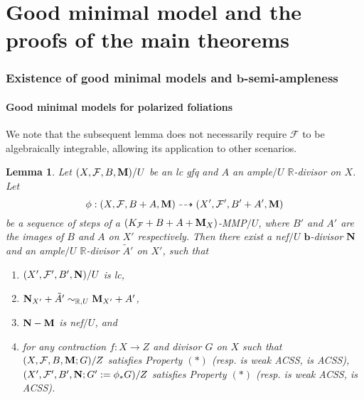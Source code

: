 \documentclass[11pt]{amsart}
\numberwithin{equation}{section}
\newcommand{\bb}{\bm{b}}
\newcommand{\Mm}{{\bf{M}}}
\newcommand{\Nn}{{\bf{N}}}
\newcommand{\Rr}{\mathbb{R}}
\newcommand{\Ff}{\mathcal{F}}
\newtheorem{lem}[thm]{Lemma}
\theoremstyle{definition}
\theoremstyle{definition}
\theoremstyle{definition}
\begin{document}
\part{Good minimal model and the proofs of the main theorems}\label{part:gmm}

\section{Existence of good minimal models and \texorpdfstring{$\bb$}{}-semi-ampleness}\label{sec: gmm fdlt}

\subsection{Good minimal models for polarized foliations}

We note that the subsequent lemma does not necessarily require $\Ff$ to be algebraically integrable, allowing its application to other scenarios.
\begin{lem}\label{lem: +a keep under mmp}
Let $(X,\Ff,B,\Mm)/U$ be an lc gfq and $A$ an ample$/U$ $\Rr$-divisor on $X$. Let 
$$\phi: (X,\Ff,B+A,\Mm)\dashrightarrow (X',\Ff',B'+A',\Mm)$$
be a sequence of steps of a $(K_{\Ff}+B+A+\Mm_X)$-MMP$/U$, where $B'$ and $A'$ are the images of $B$ and $A$ on $X'$ respectively. Then there exist a nef$/U$ $\bb$-divisor $\Nn$ and an ample$/U$ $\Rr$-divisor $\tilde A'$ on $X'$, such that 
\begin{enumerate}
    \item $(X',\Ff',B',\Nn)/U$ is lc,
    \item $\Nn_{X'}+\tilde A'\sim_{\mathbb R,U}\Mm_{X'}+A'$,
    \item $\Nn-\Mm$ is nef$/U$, and
    \item for any contraction $f: X\rightarrow Z$ and divisor $G$ on $X$ such that $(X,\Ff,B,\Mm;G)/Z$ satisfies Property $(*)$ (resp. is weak ACSS, is ACSS), $(X',\Ff',B',\Nn;G':=\phi_*G)/Z$ satisfies Property $(*)$ (resp. is weak ACSS, is ACSS).
\end{enumerate}
\end{lem}
\end{document}
